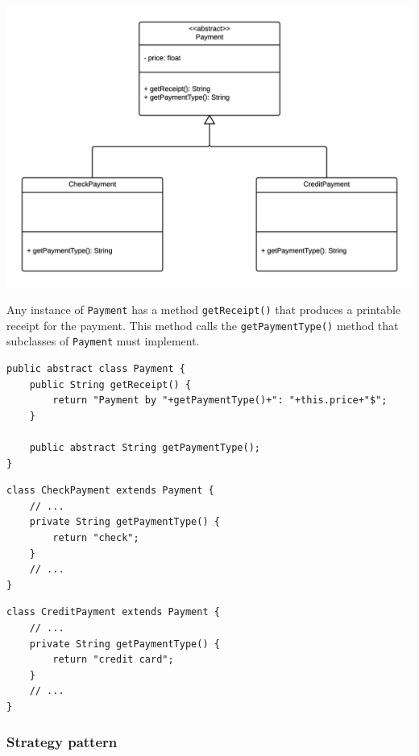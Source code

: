 \documentclass[11pt, a4paper]{article}
\newcommand{\settextlisting}{\lstset{ basicstyle=\small\ttfamily }}
\begin{document}
\includegraphics[width=\textwidth]{TemplateMethodPattern.png}

\medskip
\settextlisting
Any instance of \lstinline|Payment| has a method \lstinline|getReceipt()| that produces a printable receipt for the payment.
This method calls the \lstinline|getPaymentType()| method that subclasses of \lstinline|Payment| must implement.


\bigskip
\lstset{%
	basicstyle=\scriptsize\ttfamily,
}

\begin{lstlisting}
public abstract class Payment {
	public String getReceipt() {
		return "Payment by "+getPaymentType()+": "+this.price+"$";
	}
	
	public abstract String getPaymentType();
}
\end{lstlisting}


\begin{lstlisting}
class CheckPayment extends Payment {
	// ...
	private String getPaymentType() {
		return "check";
	}
	// ...
}
\end{lstlisting}


\begin{lstlisting}
class CreditPayment extends Payment {
	// ...
	private String getPaymentType() {
		return "credit card";
	}
	// ...
}
\end{lstlisting}




\subsubsection*{Strategy pattern}
\end{document}
